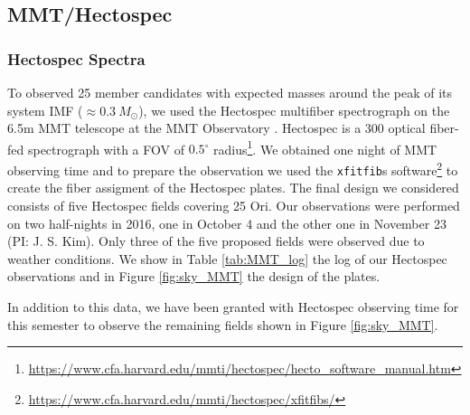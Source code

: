 \documentclass[12pt]{article}
\begin{document}
\subsection{MMT/Hectospec}
\label{sec:Hectospec}

\subsubsection{Hectospec Spectra}
\label{sec_hectospec:spectra}
To observed 25 member candidates with expected masses around the peak of its system IMF ($\approx0.3\ M_\odot$), we used the Hectospec multifiber spectrograph on the 6.5m MMT telescope at the MMT Observatory \citep{Fabricant2005}. Hectospec is a 300 optical fiber-fed spectrograph with a FOV of $0.5^\circ$ radius\footnote{\url{https://www.cfa.harvard.edu/mmti/hectospec/hecto_software_manual.htm}}. We obtained one night of MMT observing time and to prepare the observation we used the \texttt{xfitfib}s software\footnote{\url{https://www.cfa.harvard.edu/mmti/hectospec/xfitfibs/}} to create the fiber assigment of the Hectospec plates. The final design we considered consists of five Hectospec fields covering 25 Ori. Our observations were performed on two half-nights in 2016, one in October 4 and the other one in November 23 (PI: J. S. Kim). Only three of the five proposed fields were observed due to weather conditions. We show in Table \ref{tab:MMT_log} the log of our Hectospec observations and in Figure \ref{fig:sky_MMT} the design of the plates.

In addition to this data, we have been granted with Hectospec observing time for this semester to observe the remaining fields shown in Figure \ref{fig:sky_MMT}.
\end{document}
